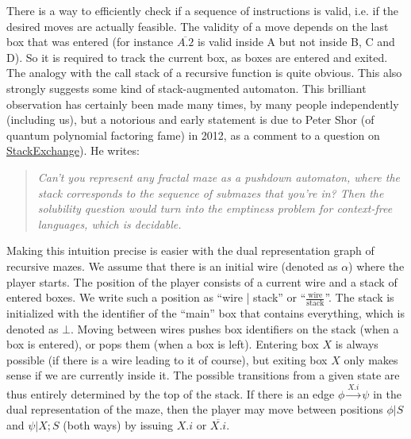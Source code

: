 \documentclass[a4paper,UKenglish,cleveref, autoref]{lipics-v2021}
\begin{document}
There is a way to efficiently check if a sequence of instructions is valid,
i.e. if the desired moves are actually feasible. The validity of a move depends
on the last box that was entered (for instance $\overline{A.2}$ is valid inside
A but not inside B, C and D). So it is required to track the current box, as
boxes are entered and exited. The analogy with the call stack of a recursive
function is quite obvious. This also strongly suggests some kind of
stack-augmented automaton. This brilliant observation has certainly been made
many times, by many people independently (including us), but a notorious and
early statement is due to Peter Shor (of quantum polynomial factoring fame) in
2012, as a comment to a question on
\href{https://cstheory.stackexchange.com/questions/11024/decidability-of-fractal-maze}{StackExchange}). He
writes:
\begin{quote}
  \it 
  Can't you represent any fractal maze as a pushdown automaton, where the stack
  corresponds to the sequence of submazes that you're in? Then the solubility
  question would turn into the emptiness problem for context-free languages,
  which is decidable.
\end{quote}

Making this intuition precise is easier with the dual representation graph of
recursive mazes. We assume that there is an initial wire (denoted as $\alpha$)
where the player starts. The position of the player consists of a current wire
and a stack of entered boxes. We write such a position as ``wire | stack'' or
``$\frac{\text{wire}}{\text{stack}}$''. The stack is initialized with the
identifier of the ``main'' box that contains everything, which is denoted as
$\bot$. Moving between wires pushes box identifiers on the stack (when a box is
entered), or pops them (when a box is left). Entering box $X$ is always possible
(if there is a wire leading to it of course), but exiting box $X$ only makes
sense if we are currently inside it.  The possible transitions from a given
state are thus entirely determined by the top of the stack. If there is an edge
$\phi \xrightarrow{X.i} \psi$ in the dual representation of the maze, then the
player may move between positions $\phi | S$ and $\psi | X ; S$ (both ways) by
issuing $X.i$ or $\overline{X.i}$.
\end{document}
